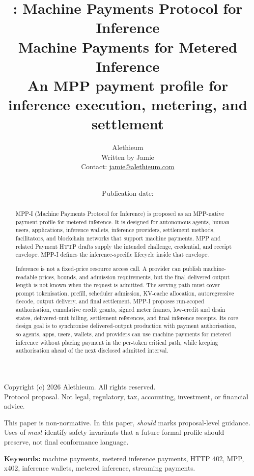\documentclass[11pt]{article}
\title{\textbf{\mppi{}: Machine Payments Protocol for Inference}\\\large Machine Payments for Metered Inference\\\normalsize An MPP payment profile for inference execution, metering, and settlement}
\author{Alethieum\\Written by Jamie\\Contact: \href{mailto:jamie@alethieum.com}{jamie@alethieum.com}}
\date{\docversion\\Publication date: \publicationdate}
\newcommand{\field}[1]{\texttt{\detokenize{#1}}}
\newcommand{\mppi}{MPP-I}
\newcommand{\copyrightnotice}{Copyright (c) 2026 Alethieum. All rights reserved.}
\newcommand{\statusnotice}{Protocol proposal. Not legal, regulatory, tax, accounting, investment, or financial advice.}
\begin{document}
\maketitle

\begin{center}
{\small \copyrightnotice}\\[-0.15em]
{\small \statusnotice}
\end{center}

\begin{center}
\begin{minipage}{0.92\linewidth}
\small This paper is non-normative. In this paper, \emph{should} marks proposal-level guidance. Uses of \emph{must} identify safety invariants that a future formal profile should preserve, not final conformance language.
\end{minipage}
\end{center}

\begin{abstract}
\mppi{} (Machine Payments Protocol for Inference) is proposed as an MPP-native payment profile for metered inference. It is designed for autonomous agents, human users, applications, inference wallets, inference providers, settlement methods, facilitators, and blockchain networks that support machine payments. MPP and related Payment HTTP drafts supply the intended \field{402} challenge, credential, and receipt envelope. \mppi{} defines the inference-specific lifecycle inside that envelope.

\noindent Inference is not a fixed-price resource access call. A provider can publish machine-readable prices, bounds, and admission requirements, but the final delivered output length is not known when the request is admitted. The serving path must cover prompt tokenisation, prefill, scheduler admission, KV-cache allocation, autoregressive decode, output delivery, and final settlement. \mppi{} proposes run-scoped authorisation, cumulative credit grants, signed meter frames, low-credit and drain states, delivered-unit billing, settlement references, and final inference receipts. Its core design goal is to synchronise delivered-output production with payment authorisation, so agents, apps, users, wallets, and providers can use machine payments for metered inference without placing payment in the per-token critical path, while keeping authorisation ahead of the next disclosed admitted interval.
\end{abstract}

\textbf{Keywords:} machine payments, metered inference payments, HTTP 402, MPP, x402, inference wallets, metered inference, streaming payments.
\end{document}
